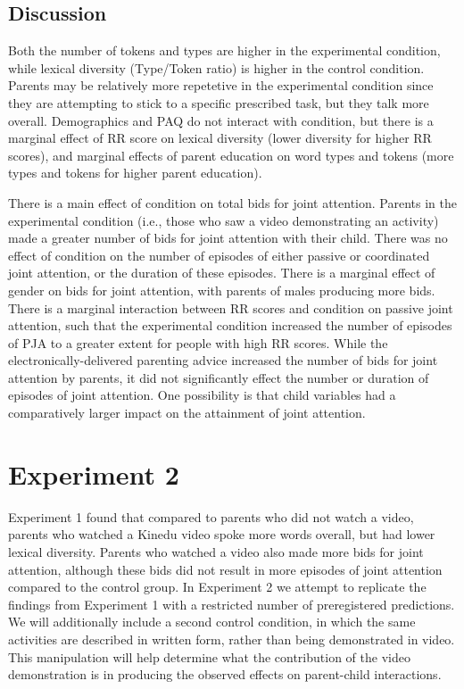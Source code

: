 \documentclass[10pt, letterpaper]{article}
\begin{document}
\subsection{Discussion}\label{discussion}

Both the number of tokens and types are higher in the experimental
condition, while lexical diversity (Type/Token ratio) is higher in the
control condition. Parents may be relatively more repetetive in the
experimental condition since they are attempting to stick to a specific
prescribed task, but they talk more overall. Demographics and PAQ do not
interact with condition, but there is a marginal effect of RR score on
lexical diversity (lower diversity for higher RR scores), and marginal
effects of parent education on word types and tokens (more types and
tokens for higher parent education).

There is a main effect of condition on total bids for joint attention.
Parents in the experimental condition (i.e., those who saw a video
demonstrating an activity) made a greater number of bids for joint
attention with their child. There was no effect of condition on the
number of episodes of either passive or coordinated joint attention, or
the duration of these episodes. There is a marginal effect of gender on
bids for joint attention, with parents of males producing more bids.
There is a marginal interaction between RR scores and condition on
passive joint attention, such that the experimental condition increased
the number of episodes of PJA to a greater extent for people with high
RR scores. While the electronically-delivered parenting advice increased
the number of bids for joint attention by parents, it did not
significantly effect the number or duration of episodes of joint
attention. One possibility is that child variables had a comparatively
larger impact on the attainment of joint attention.

\section{Experiment 2}\label{experiment-2}

Experiment 1 found that compared to parents who did not watch a video,
parents who watched a Kinedu video spoke more words overall, but had
lower lexical diversity. Parents who watched a video also made more bids
for joint attention, although these bids did not result in more episodes
of joint attention compared to the control group. In Experiment 2 we
attempt to replicate the findings from Experiment 1 with a restricted
number of preregistered predictions. We will additionally include a
second control condition, in which the same activities are described in
written form, rather than being demonstrated in video. This manipulation
will help determine what the contribution of the video demonstration is
in producing the observed effects on parent-child interactions.
\end{document}
